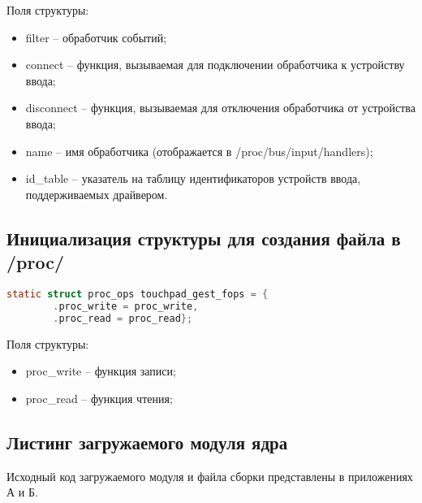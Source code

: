 Поля структуры:
\begin{itemize}
	\item filter -- обработчик событий;
	\item connect -- функция, вызываемая для подключении обработчика к устройству ввода;
	\item disconnect -- функция, вызываемая для отключения обработчика от устройства ввода;
	\item name -- имя обработчика (отображается в /proc/bus/input/handlers);
	\item id\_table -- указатель на таблицу идентификаторов устройств ввода, поддерживаемых драйвером.
\end{itemize}

\subsection{Инициализация структуры для создания файла в /proc/}

\begin{lstlisting}[label=lst:sproc,caption=Заполнение структуры proc, language=c]
	static struct proc_ops touchpad_gest_fops = {
		.proc_write = proc_write,
		.proc_read = proc_read};
\end{lstlisting}

Поля структуры:
\begin{itemize}
	\item proc\_write -- функция записи;
	\item proc\_read -- функция чтения;
\end{itemize}

\subsection{Листинг загружаемого модуля ядра}

Исходный код загружаемого модуля и файла сборки представлены в приложениях А и Б.

\clearpage